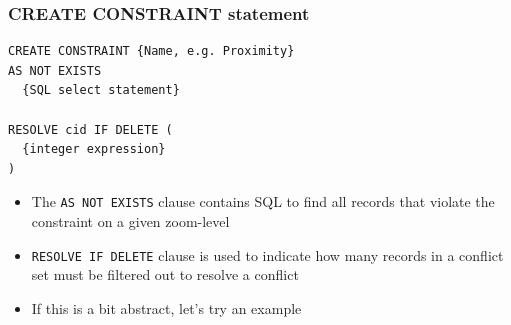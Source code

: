 \documentclass{beamer}
\begin{document}
\begin{frame}[fragile]
\frametitle{CREATE CONSTRAINT statement}
\begin{lstlisting}
CREATE CONSTRAINT {Name, e.g. Proximity}
AS NOT EXISTS
  {SQL select statement}
  
RESOLVE cid IF DELETE (
  {integer expression}
)
\end{lstlisting}

\begin{itemize}
\item The \texttt{AS NOT EXISTS} clause contains SQL to find all records that violate the constraint on a given zoom-level
\item \texttt{RESOLVE IF DELETE} clause is used to indicate how many records in a conflict set must be filtered out to resolve a conflict
\item If this is a bit abstract, let's try an example
\end{itemize}
\end{frame}
\end{document}
